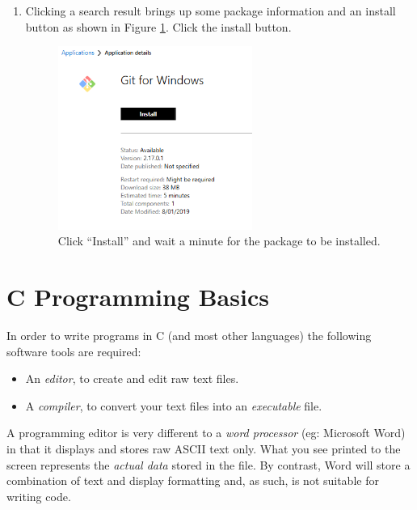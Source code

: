 \documentclass{lab}
\begin{document}
\begin{enumerate}
\item Clicking a search result brings up some package information and an install button as shown in Figure \ref{fig:SoftwareCenterInstall}. Click the install button.

\begin{figure}[H]
\begin{center}
\includegraphics[width=0.6\textwidth]{Wk1Images/softwareInstall.PNG}
\end{center}
\caption{Click ``Install'' and wait a minute for the package to be installed.}
\label{fig:SoftwareCenterInstall}
\end{figure}

\end{enumerate}

\pagebreak
\section{C Programming Basics}
In order to write programs in C (and most other languages) the following software tools are required:

\begin{itemize}
\item An \textit{editor}, to create and edit raw text files.
\item A \textit{compiler}, to convert your text files into an \textit{executable} file.
\end{itemize}

A programming editor is very different to a \textit{word processor} (eg: Microsoft Word) in that it displays and stores raw ASCII text only. What you see printed to the screen represents the \textit{actual data} stored in the file. By contrast, Word will store a combination of text and display formatting and, as such, is not suitable for writing code.
\end{document}
